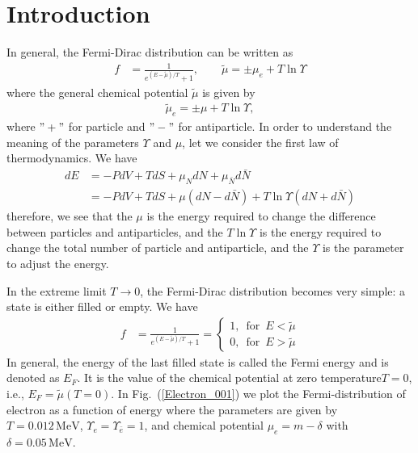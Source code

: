 \documentclass[sn-mathphys,Numbered]{sn-jnl}
\theoremstyle{thmstyleone}%
\theoremstyle{thmstyletwo}%
\theoremstyle{thmstylethree}%
\begin{document}
\section{Introduction}\label{sec1}

In general, the Fermi-Dirac distribution can be written as
\begin{align}
\label{Fermi_exact}
f&=\frac{1}{e^{(E-\tilde{\mu})/T}+1},\qquad\tilde\mu=\pm\mu_e+T\ln\Upsilon
\end{align}
where the general chemical potential $\tilde\mu$ is given by
\begin{align}
\tilde\mu_e=\pm\mu+T\ln\Upsilon,
\end{align}
where $"+"$ for particle and $"-"$ for antiparticle. In order to understand the meaning of the parameters $\Upsilon$ and $\mu$, let we consider the first law of thermodynamics. We have
\begin{align}
dE&=-PdV+TdS+{\mu_N}dN+{\mu_{\bar{N}}}d{\bar{N}}
\\&=-PdV+TdS+{\mu}(dN-d{\bar{N}})+T\ln{\Upsilon}(dN+d{\bar{N}})
\end{align}
therefore, we see that the $\mu$ is the energy required to change the difference between particles and antiparticles, and the $T\ln\Upsilon$ is the energy required to change the total number of particle and antiparticle, and the $\Upsilon$ is the parameter to adjust the energy.

In the extreme limit $T\rightarrow0$, the Fermi-Dirac distribution becomes very simple: a state is either filled or empty. We have
\begin{align}
f&=\frac{1}{e^{(E-\tilde{\mu})/T}+1}=\left\{\begin{array}{c}1,\,\,\,\mathrm{for}\,\,\,{E}<\tilde{\mu} \\0,\,\,\,\mathrm{for}\,\,\, {E}>\tilde{\mu}\end{array}\right.
\end{align}
In general, the energy of the last filled state is called the Fermi energy and is denoted as $E_F$. It is the value of the chemical potential at zero temperature$T=0$, i.e., $E_F=\tilde\mu(T = 0)$. In Fig.~(\ref{Electron_001}) we plot the Fermi-distribution of electron as a function of energy where the parameters are given by $T=0.012\,\mathrm{MeV}$, $\Upsilon_e=\Upsilon_{\bar e}=1$, and chemical potential $\mu_e=m-\delta$ with $\delta=0.05\,\mathrm{MeV}$.
\end{document}

